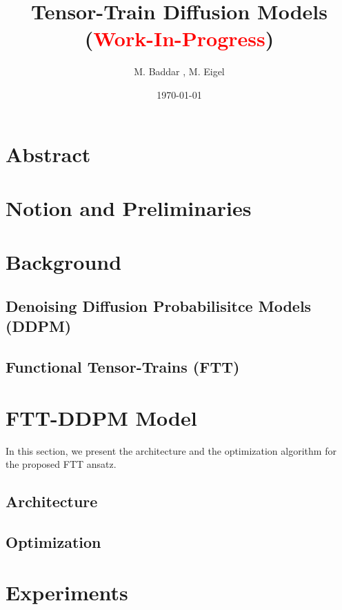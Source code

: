 \documentclass[11pt]{article}
\title{Tensor-Train Diffusion Models (\textcolor{red}{Work-In-Progress})}
\author{M. Baddar , M. Eigel}
\date{\today}
\begin{document}
    \maketitle


    \section{Abstract}\label{sec:abstract}
    



    \section{Notion and Preliminaries}\label{sec:notioan-and-preliminarities}
    


    \section{Background}\label{sec:background}

    \subsection{Denoising Diffusion Probabilisitce Models (DDPM)}\label{subsec:ddpm}
    

    \subsection{Functional Tensor-Trains (FTT)}\label{subsec:functional-tensor-trains}
    



    \section{FTT-DDPM Model}\label{sec:proposed-model}
    In this section, we present the architecture and the optimization algorithm for the proposed FTT ansatz.

    \subsection{Architecture}\label{subsec:architecture}
    

    \subsection{Optimization}\label{subsec:optimization}
    



    \section{Experiments}\label{sec:experiments}
    


    
    \appendix
\end{document}
